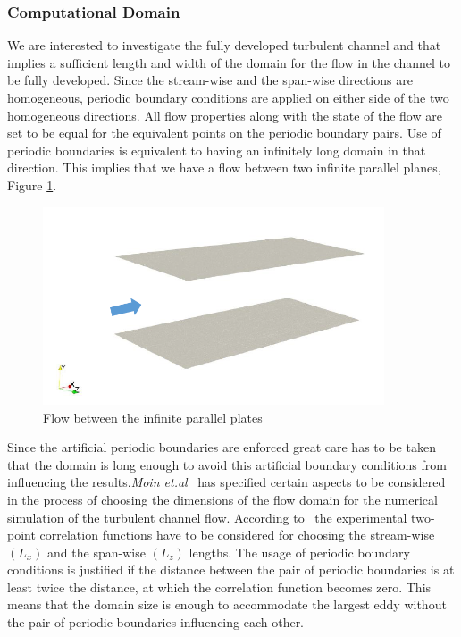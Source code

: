 \subsubsection{Computational Domain}
We are interested to investigate the fully developed turbulent channel and that implies a sufficient length and width of the domain for the flow in the channel to be fully developed. Since the stream-wise and the span-wise directions are homogeneous, periodic boundary conditions are applied on either side of the two homogeneous directions. All flow properties along with the state of the flow are set to be equal for the equivalent points on the periodic boundary pairs. Use of periodic boundaries is equivalent to having an infinitely long domain in that direction. This implies that we have a flow between two infinite parallel planes, Figure \ref{infinite plates}.
%
\begin{figure}[h]
    \centering
    \includegraphics[width=0.9\textwidth]{figur/Infinite_plates.png}
    \caption{Flow between the infinite parallel plates}
    \label{infinite plates}
\end{figure}
%
Since the artificial periodic boundaries are enforced great care has to be taken that the domain is long enough to avoid this artificial boundary conditions from influencing the results.\emph{Moin et.al}~\cite{Moin:78} has specified certain aspects to be considered in the process of choosing the dimensions of the flow domain for the numerical simulation of the turbulent channel flow. According to~\cite{Moin:78} the experimental two-point correlation functions have to be considered for choosing the stream-wise $\left(L_x\right)$ and the span-wise $\left(L_z\right)$ lengths. The usage of periodic boundary conditions is justified if the distance between the pair of periodic boundaries is at least twice the distance, at which the correlation function becomes zero. This means that the domain size is enough to accommodate the largest eddy without the pair of periodic boundaries influencing each other.\\

